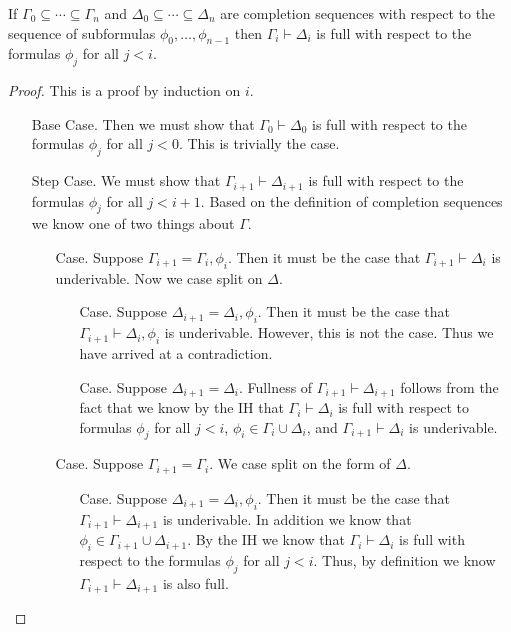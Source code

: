 \documentclass{article}
\begin{document}
\begin{lemma}
  \label{lemma:completion_aux}
  If $\Gamma_0 \subseteq \cdots \subseteq \Gamma_n$ and $\Delta_0 \subseteq \cdots \subseteq \Delta_n$ are
  completion sequences with respect to the sequence of subformulas $\phi_0, \ldots , \phi_{n-1}$ then 
  $\Gamma_i \vdash \Delta_i$ is full with respect to the formulas $\phi_j$ for all $j < i$.
\end{lemma}
\begin{proof}
  This is a proof by induction on $i$. 
  \begin{itemize}
  \item[Base Case.] Then we must show that $\Gamma_0 \vdash \Delta_0$ is full with respect to
    the formulas $\phi_j$ for all $j < 0$.  This is trivially the case.

  \item[Step Case.] We must show that $\Gamma_{i+1} \vdash \Delta_{i+1}$ is full with respect to the formulas
    $\phi_j$ for all $j < i+1$.  Based on the definition of completion sequences we know one of two things
    about $\Gamma$.
    \begin{itemize}
    \item[Case.] Suppose $\Gamma_{i+1} = \Gamma_i,\phi_i$.  Then it must be the case that 
      $\Gamma_{i+1} \vdash \Delta_{i}$ is underivable.  Now we case split on $\Delta$.
      \begin{itemize}
      \item[Case.] Suppose $\Delta_{i+1} = \Delta_i,\phi_i$.  Then it must be the case that 
        $\Gamma_{i+1} \vdash \Delta_i,\phi_i$ is underivable.  However, this is not the case.
        Thus we have arrived at a contradiction.

      \item[Case.] Suppose $\Delta_{i+1} = \Delta_{i}$.  Fullness of $\Gamma_{i+1} \vdash \Delta_{i+1}$
        follows from the fact that we know by the IH that $\Gamma_i \vdash \Delta_i$ is full with respect
        to formulas $\phi_j$ for all $j < i$, $\phi_i \in \Gamma_i \cup \Delta_i$, and $\Gamma_{i+1} \vdash \Delta_i$
        is underivable.
      \end{itemize}

    \item[Case.] Suppose $\Gamma_{i+1} = \Gamma_i$.  We case split on the form of $\Delta$.
      \begin{itemize}
      \item[Case.] Suppose $\Delta_{i+1} = \Delta_i,\phi_i$.  Then it must be the case that 
        $\Gamma_{i+1} \vdash \Delta_{i+1}$ is underivable.  In addition we know that 
        $\phi_i \in \Gamma_{i+1} \cup \Delta_{i+1}$.  By the IH we know that $\Gamma_i \vdash \Delta_i$ is
        full with respect to the formulas $\phi_j$ for all $j < i$.  Thus, by definition we know
        $\Gamma_{i+1} \vdash \Delta_{i+1}$ is also full.
        

\end{itemize}
\end{itemize}
\end{itemize}
\end{proof}
\end{document}
